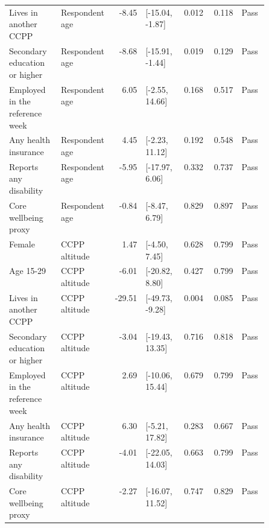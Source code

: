 \begin{longtable}{@{}p{0.20\linewidth}p{0.16\linewidth}rp{0.14\linewidth}rrl@{}}
Lives in another CCPP & Respondent age & -8.45 & [-15.04, -1.87] & 0.012 & 0.118 & Pass \\
Secondary education or higher & Respondent age & -8.68 & [-15.91, -1.44] & 0.019 & 0.129 & Pass \\
Employed in the reference week & Respondent age & 6.05 & [-2.55, 14.66] & 0.168 & 0.517 & Pass \\
Any health insurance & Respondent age & 4.45 & [-2.23, 11.12] & 0.192 & 0.548 & Pass \\
Reports any disability & Respondent age & -5.95 & [-17.97, 6.06] & 0.332 & 0.737 & Pass \\
Core wellbeing proxy & Respondent age & -0.84 & [-8.47, 6.79] & 0.829 & 0.897 & Pass \\
Female & CCPP altitude & 1.47 & [-4.50, 7.45] & 0.628 & 0.799 & Pass \\
Age 15-29 & CCPP altitude & -6.01 & [-20.82, 8.80] & 0.427 & 0.799 & Pass \\
Lives in another CCPP & CCPP altitude & -29.51 & [-49.73, -9.28] & 0.004 & 0.085 & Pass \\
Secondary education or higher & CCPP altitude & -3.04 & [-19.43, 13.35] & 0.716 & 0.818 & Pass \\
Employed in the reference week & CCPP altitude & 2.69 & [-10.06, 15.44] & 0.679 & 0.799 & Pass \\
Any health insurance & CCPP altitude & 6.30 & [-5.21, 17.82] & 0.283 & 0.667 & Pass \\
Reports any disability & CCPP altitude & -4.01 & [-22.05, 14.03] & 0.663 & 0.799 & Pass \\
Core wellbeing proxy & CCPP altitude & -2.27 & [-16.07, 11.52] & 0.747 & 0.829 & Pass \\
\end{longtable}
\endgroup
